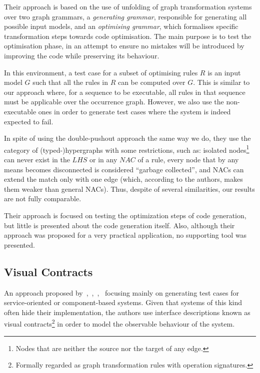 Their approach is based on the use of unfolding of graph transformation systems~\cite{Ribeiro1996} over two graph grammars, a \textit{generating grammar}, responsible for generating all possible input models, and an \textit{optimising grammar}, which formalises specific transformation steps towards code optimisation.
The main purpose is to test the optimisation phase, in an attempt to ensure no mistakes will be introduced by improving the code while preserving its behaviour.


In this environment, a test case for a subset of optimising rules $R$ is an input model $G$ such that all the rules in $R$ can be computed over $G$. This is similar to our approach where, for a sequence to be executable, all rules in that sequence must be applicable over the occurrence graph. However, we also use the non-executable ones in order to generate test cases where the system is indeed expected to fail.

In spite of using the double-pushout approach the same way we do, they use the category of (typed-)hypergraphs with some restrictions, such as: isolated nodes\footnote{ Nodes that are neither the source nor the target of any edge.} can never exist in the $LHS$ or in any $NAC$ of a rule, every node that by any means becomes disconnected is considered ``garbage collected'', and NACs can extend the match only with one edge (which, according to the authors, makes them weaker than general NACs).
Thus, despite of several similarities, our results are not fully comparable.

Their approach is focused on testing the optimization steps of code generation, but little is presented about the code generation itself. Also, although their approach was proposed for a very practical application, no supporting tool was presented.



\subsection{Visual Contracts}

  An approach proposed by~\cite{Heckel2011},~\cite{Khan2012},~\cite{Khan2012a},~\cite{Runge2013} focusing mainly on generating test cases for service-oriented or component-based systems.
  Given that systems of this kind often hide their implementation, the authors use interface descriptions known as visual contracts\footnote{ Formally regarded as graph transformation rules with operation signatures.} in order to model the observable behaviour of the system.

